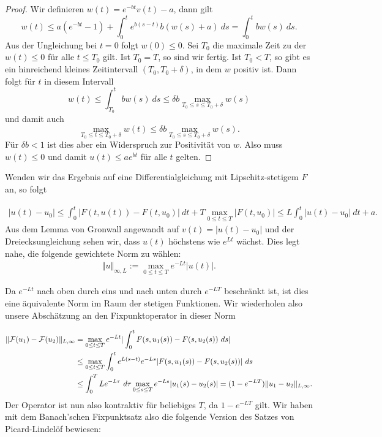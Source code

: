 \begin{proof}
Wir definieren $w(t) = e^{-bt} v(t) - a$, dann gilt 
$$ w(t) \leq a (e^{-bt}-1)+ \int_0^t e^{b(s-t)} b (w(s)+a)~ds = \int_0^t b w(s)~ds. $$
Aus der Ungleichung bei $t=0$ folgt $w(0) \leq 0$. Sei $T_0$ die maximale Zeit zu der $w(t) \leq 0$ für alle $t \leq T_0$ gilt. Ist $T_0=T$, so sind wir fertig. Ist $T_0 < T$, so gibt es ein hinreichend kleines Zeitintervall $(T_0,T_0+\delta)$, in dem $w$ positiv ist. Dann folgt für $t$ in diesem Intervall
$$ w(t) \leq \int_{T_0}^t b w(s) ~ds \leq \delta b \max_{T_0 \leq s \leq T_0 + \delta} w(s) $$ 
und damit auch 
$$   \max_{T_0 \leq t \leq T_0 + \delta} w(t)  \leq \delta b \max_{T_0 \leq s \leq T_0 + \delta} w(s) . $$
Für $\delta b < 1$ ist dies aber ein Widerspruch zur Positivität von $w$. Also muss $w(t) \leq 0$ und damit $u(t) \leq a e^{bt}$ für alle $t$ gelten.
\end{proof}

Wenden wir das Ergebnis auf eine Differentialgleichung mit Lipschitz-stetigem $F$ an, so folgt
 
\begin{align*}
\vert u(t) -u_0 \vert \leq \int_0^t \vert F(t,u(t)) - F(t,u_0) \vert ~dt + T \max_{0 \leq t \leq T} \vert F(t,u_0)\vert \leq L 
\int_0^t \vert u(t) - u_0\vert ~dt + a.
\end{align*}
Aus dem Lemma von Gronwall angewandt auf $v(t) = \vert u(t) - u_0 \vert$ und der Dreiecksungleichung sehen wir, dass $u(t)$ höchstens wie $e^{Lt}$ wächst. Dies legt nahe, die folgende gewichtete Norm zu wählen:
\begin{align*}
\Vert u \Vert_{\infty,L} := \max_{0 \leq t \leq T} e^{-Lt} \vert u(t) \vert.
\end{align*}

Da $e^{-Lt}$ nach oben durch eins und nach unten durch $e^{-LT}$ beschränkt ist, ist dies eine äquivalente Norm im Raum der stetigen Funktionen. Wir wiederholen also unsere Abschätzung an den Fixpunktoperator in dieser Norm

 \begin{align*} 
\Vert {\cal F}(u_1) - {\cal F}(u_2) \Vert_{L,\infty} &= \max_{0 \leq t \leq T}  e^{-Lt}\vert \int_0^t F(s,u_1(s)) - F(s,u_2(s)) ~ds \vert \\
&\leq  \max_{0 \leq t \leq T} \int_0^t e^{L(s-t)} e^{-Ls} \vert  F(s,u_1(s)) - F(s,u_2(s))\vert  ~ds  \\ &\leq  \int_0^T L e^{-L\tau}~d\tau  \max_{0 \leq s \leq T}  e^{-Ls} \vert u_1(s) - u_2(s) \vert = (1-e^{-LT}) \Vert u_1 - u_2 \Vert_{L,\infty}. 
\end{align*}
Der Operator ist nun also kontraktiv für beliebiges $T$, da $1- e^{-LT}$ gilt. Wir haben mit dem Banach'schen Fixpunktsatz also die folgende Version des Satzes von Picard-Lindelöf bewiesen:

